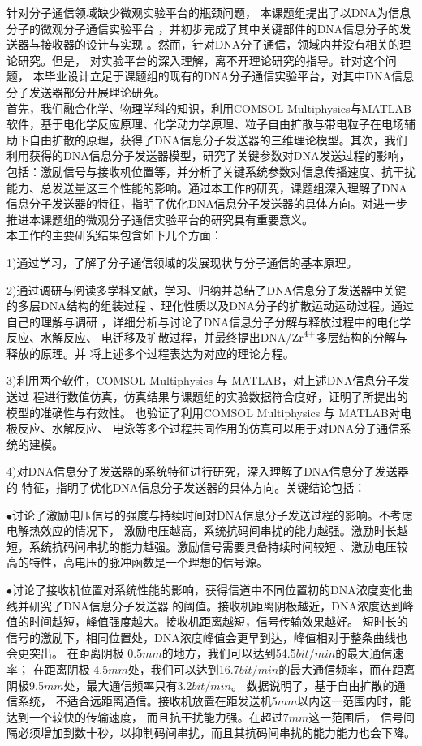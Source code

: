 
\begin{summary}
针对分子通信领域缺少微观实验平台的瓶颈问题，
本课题组提出了以DNA为信息分子的微观分子通信实验平台
 ，并初步完成了其中关键部件的DNA信息分子的发送器与接收器的设计与实现
。然而，针对DNA分子通信，领域内并没有相关的理论研究。但是，
对实验平台的深入理解，离不开理论研究的指导。针对这个问题，
本毕业设计立足于课题组的现有的DNA分子通信实验平台，对其中DNA信息分子发送器部分开展理论研究。\\

首先，我们融合化学、物理学科的知识，利用COMSOL Multiphysics与MATLAB软件，基于电化学反应原理、化学动力学原理、粒子自由扩散与带电粒子在电场辅助下自由扩散的原理，获得了DNA信息分子发送器的三维理论模型。其次，我们利用获得的DNA信息分子发送器模型，研究了关键参数对DNA发送过程的影响，包括：激励信号与接收机位置等，并分析了关键系统参数对信息传播速度、抗干扰能力、总发送量这三个性能的影响。通过本工作的研究，课题组深入理解了DNA信息分子发送器的特征，指明了优化DNA信息分子发送器的具体方向。对进一步推进本课题组的微观分子通信实验平台的研究具有重要意义。\\

本工作的主要研究结果包含如下几个方面：

1)通过学习，了解了分子通信领域的发展现状与分子通信的基本原理。 

2)通过调研与阅读多学科文献，学习、归纳并总结了DNA信息分子发送器中关键的多层DNA结构的组装过程
、理化性质以及DNA分子的扩散运动运动过程。通过自己的理解与调研
，详细分析与讨论了DNA信息分子分解与释放过程中的电化学反应、水解反应、
电迁移及扩散过程，并最终提出DNA/$\ce{Zr^4+}$多层结构的分解与释放的原理。并
将上述多个过程表达为对应的理论方程。

3)利用两个软件，COMSOL Multiphysics 与 MATLAB，对上述DNA信息分子发送过
程进行数值仿真，仿真结果与课题组的实验数据符合度好，证明了所提出的模型的准确性与有效性。
也验证了利用COMSOL Multiphysics 与 MATLAB对电极反应、水解反应、
电泳等多个过程共同作用的仿真可以用于对DNA分子通信系统的建模。

4)对DNA信息分子发送器的系统特征进行研究，深入理解了DNA信息分子发送器的
特征，指明了优化DNA信息分子发送器的具体方向。关键结论包括：

$\bullet$讨论了激励电压信号的强度与持续时间对DNA信息分子发送过程的影响。不考虑电解热效应的情况下，
激励电压越高，系统抗码间串扰的能力越强。激励时长越短，系统抗码间串扰的能力越强。激励信号需要具备持续时间较短
、激励电压较高的特性，高电压的脉冲函数是一个理想的信号源。

$\bullet$讨论了接收机位置对系统性能的影响，获得信道中不同位置初的DNA浓度变化曲线并研究了DNA信息分子发送器
的阈值。接收机距离阴极越近，DNA浓度达到峰值的时间越短，峰值强度越大。接收机距离越短，信号传输效果越好。
短时长的信号的激励下，相同位置处，DNA浓度峰值会更早到达，峰值相对于整条曲线也会更突出。
在距离阴极 0.5$mm$的地方，我们可以达到54.5$bit/min$的最大通信速率；
在距离阴极 4.5$mm$处，我们可以达到16.7$bit/min$的最大通信频率，而在距离阴极9.5$mm$处，最大通信频率只有3.2$bit/min$。
数据说明了，基于自由扩散的通信系统，
不适合远距离通信。接收机放置在距发送机5$mm$以内这一范围内时，能达到一个较快的传输速度，
而且抗干扰能力强。在超过7$mm$这一范围后，
信号间隔必须增加到数十秒，以抑制码间串扰，而且其抗码间串扰的能力能力也会下降。


\end{summary}
